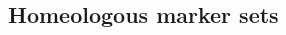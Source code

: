 \documentclass[11pt, aspectratio=169]{beamer}
\newcommand{\highlite}[1]{{\color{Carnellian} #1}}
\begin{document}
{\begin{columns}
\begin{column}{0.4\linewidth}
\end{column}

\end{columns}

}



\subsection{Homeologous marker sets}
\end{document}
